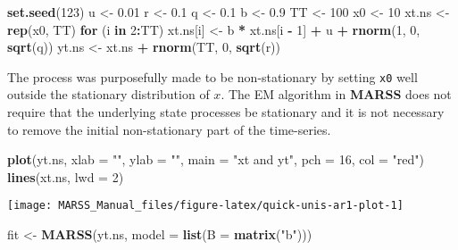 \documentclass[12pt,]{book}
\newenvironment{Shaded}{\begin{snugshade}}{\end{snugshade}}
\newcommand{\ControlFlowTok}[1]{\textcolor[rgb]{0.13,0.29,0.53}{\textbf{#1}}}
\newcommand{\DataTypeTok}[1]{\textcolor[rgb]{0.13,0.29,0.53}{#1}}
\newcommand{\DecValTok}[1]{\textcolor[rgb]{0.00,0.00,0.81}{#1}}
\newcommand{\FloatTok}[1]{\textcolor[rgb]{0.00,0.00,0.81}{#1}}
\newcommand{\KeywordTok}[1]{\textcolor[rgb]{0.13,0.29,0.53}{\textbf{#1}}}
\newcommand{\NormalTok}[1]{#1}
\newcommand{\OperatorTok}[1]{\textcolor[rgb]{0.81,0.36,0.00}{\textbf{#1}}}
\newcommand{\StringTok}[1]{\textcolor[rgb]{0.31,0.60,0.02}{#1}}
\begin{document}
\begin{Shaded}
\begin{Highlighting}[]
\KeywordTok{set.seed}\NormalTok{(}\DecValTok{123}\NormalTok{)}
\NormalTok{u <-}\StringTok{ }\FloatTok{0.01}
\NormalTok{r <-}\StringTok{ }\FloatTok{0.1}
\NormalTok{q <-}\StringTok{ }\FloatTok{0.1}
\NormalTok{b <-}\StringTok{ }\FloatTok{0.9}
\NormalTok{TT <-}\StringTok{ }\DecValTok{100}
\NormalTok{x0 <-}\StringTok{ }\DecValTok{10}
\NormalTok{xt.ns <-}\StringTok{ }\KeywordTok{rep}\NormalTok{(x0, TT)}
\ControlFlowTok{for}\NormalTok{ (i }\ControlFlowTok{in} \DecValTok{2}\OperatorTok{:}\NormalTok{TT) xt.ns[i] <-}\StringTok{ }\NormalTok{b }\OperatorTok{*}\StringTok{ }\NormalTok{xt.ns[i }\OperatorTok{-}\StringTok{ }\DecValTok{1}\NormalTok{] }\OperatorTok{+}\StringTok{ }\NormalTok{u }\OperatorTok{+}\StringTok{ }\KeywordTok{rnorm}\NormalTok{(}\DecValTok{1}\NormalTok{, }\DecValTok{0}\NormalTok{, }
    \KeywordTok{sqrt}\NormalTok{(q))}
\NormalTok{yt.ns <-}\StringTok{ }\NormalTok{xt.ns }\OperatorTok{+}\StringTok{ }\KeywordTok{rnorm}\NormalTok{(TT, }\DecValTok{0}\NormalTok{, }\KeywordTok{sqrt}\NormalTok{(r))}
\end{Highlighting}
\end{Shaded}

The process was purposefully made to be non-stationary by setting \texttt{x0} well outside the stationary distribution of \(x\). The EM algorithm in \textbf{MARSS} does not require that the underlying state processes be stationary and it is not necessary to remove the initial non-stationary part of the time-series.

\begin{Shaded}
\begin{Highlighting}[]
\KeywordTok{plot}\NormalTok{(yt.ns, }\DataTypeTok{xlab =} \StringTok{""}\NormalTok{, }\DataTypeTok{ylab =} \StringTok{""}\NormalTok{, }\DataTypeTok{main =} \StringTok{"xt and yt"}\NormalTok{, }\DataTypeTok{pch =} \DecValTok{16}\NormalTok{, }
    \DataTypeTok{col =} \StringTok{"red"}\NormalTok{)}
\KeywordTok{lines}\NormalTok{(xt.ns, }\DataTypeTok{lwd =} \DecValTok{2}\NormalTok{)}
\end{Highlighting}
\end{Shaded}

\begin{center}\texttt{[image: MARSS\_Manual\_files/figure-latex/quick-unis-ar1-plot-1]} \end{center}

\begin{Shaded}
\begin{Highlighting}[]
\NormalTok{fit <-}\StringTok{ }\KeywordTok{MARSS}\NormalTok{(yt.ns, }\DataTypeTok{model =} \KeywordTok{list}\NormalTok{(}\DataTypeTok{B =} \KeywordTok{matrix}\NormalTok{(}\StringTok{"b"}\NormalTok{)))}
\end{Highlighting}
\end{Shaded}
\end{document}
